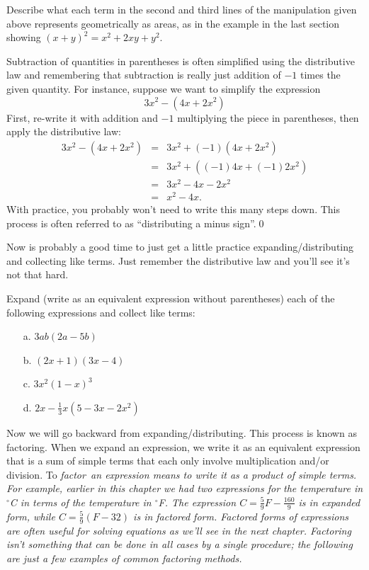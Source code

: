 \begin{question} Describe what each term in the second and third lines of the manipulation given above represents geometrically as areas, as in the example in the last section showing $(x+y)^2 = x^2+2xy+y^2$.
\end{question}

\begin{eg} Subtraction of quantities in parentheses is often simplified using the distributive law and remembering that subtraction is really just addition of $-1$ times the given quantity. For instance, suppose we want to simplify the expression
\[
3x^2 - (4x+2x^2)
\]
First, re-write it with addition and $-1$ multiplying the piece in parentheses, then apply the distributive law:
\begin{eqnarray*}
3x^2 - (4x+2x^2) & = & 3x^2 + (-1)(4x+2x^2)\\
\ & = & 3x^2+((-1)4x+(-1)2x^2)\\
\ & = & 3x^2-4x-2x^2\\
\ & = & x^2-4x.
\end{eqnarray*}
With practice, you probably won't need to write this many steps down. This process is often referred to as ``distributing a minus sign''.\qed
\end{eg}

Now is probably a good time to just get a little practice expanding/distributing and collecting like terms. Just remember the distributive law and you'll see it's not that hard.

\par 

\begin{question} Expand (write as an equivalent expression without parentheses) each of the following expressions and collect like terms:
\begin{enumerate}
\item[a.] $3ab(2a-5b)$
\item[b.] $(2x+1)(3x-4)$
\item[c.] $3x^2(1-x)^3$
\item[d.] $2x-\frac{1}{3}x(5-3x-2x^2)$
\end{enumerate}
\end{question}

\par 

Now we will go backward from expanding/distributing. This process is known as factoring. When we expand an expression, we write it as an equivalent expression that is a sum of simple terms that each only involve multiplication and/or division. To \it{factor}\ \normalfont an expression means to write it as a product of simple terms. For example, earlier in this chapter we had two expressions for the temperature in $^{\circ}$C in terms of the temperature in $^{\circ}$F. The expression $C = \frac{5}{9}F - \frac{160}{9}$ is in expanded form, while $C = \frac{5}{9}(F-32)$ is in factored form. Factored forms of expressions are often useful for solving equations as we'll see in the next chapter. Factoring isn't something that can be done in all cases by a single procedure; the following are just a few examples of common factoring methods.

